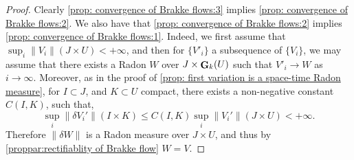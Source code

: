 \documentclass{article}
\theoremstyle{plain}
\theoremstyle{definition}
\theoremstyle{plain}
\theoremstyle{remark}
\theoremstyle{remark}
\theoremstyle{plain}
\DeclareMathOperator{\G}{{\bf G}}
\begin{document}
\begin{proof}
    Clearly \ref{prop: convergence of Brakke flows:3} implies \ref{prop: convergence of Brakke flows:2}.
    We also have that \ref{prop: convergence of Brakke flows:2} implies \ref{prop: convergence of Brakke flows:1}. 
    Indeed, we first assume that $\sup_{i} \| V_{i} \| (J \times U) < + \infty$, and then for $\{V'_i\}$ a subsequence of $\{ V_i\}$, we may assume that there exists a Radon $W$ over $J \times \G_k(U)$ such that $V'_i \to W$ as $i\to\infty$.
    Moreover, as in the proof of \ref{prop: first variation is a space-time Radon measure}, for $I \subset J$, and $K \subset U$ compact, there exists a non-negative constant $C (I, K)$, such that, 
    \begin{equation*}
        \textstyle \sup_{i} \| \delta V_{i}'\| (I \times K) \leq C (I, K) \sup_{i} \| V_{i}' \| (J \times U) < + \infty.
    \end{equation*}
    Therefore $\| \delta W \|$ is a Radon measure over $J \times U$, and thus by \ref{proppar:rectifiablity of Brakke flow} $W = V$.
    

\end{proof}
\end{document}
